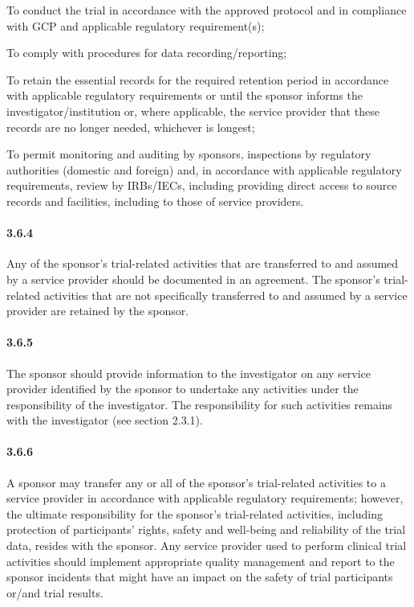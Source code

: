 \documentclass[11pt]{article}
\begin{document}
\begin{description}[leftmargin=2.5cm,style=sameline]

\item[(a)] To conduct the trial in accordance with the approved protocol and in compliance with GCP and applicable regulatory requirement(s);

\item[(b)] To comply with procedures for data recording/reporting;

\item[(c)] To retain the essential records for the required retention period in accordance with applicable regulatory requirements or until the sponsor informs the investigator/institution or, where applicable, the service provider that these records are no longer needed, whichever is longest;

\item[(d)] To permit monitoring and auditing by sponsors, inspections by regulatory authorities (domestic and foreign) and, in accordance with applicable regulatory requirements, review by IRBs/IECs, including providing direct access to source records and facilities, including to those of service providers.

\end{description}

\paragraph{3.6.4} Any of the sponsor's trial-related activities that are transferred to and assumed by a service provider should be documented in an agreement. The sponsor's trial-related activities that are not specifically transferred to and assumed by a service provider are retained by the sponsor.

\paragraph{3.6.5} The sponsor should provide information to the investigator on any service provider identified by the sponsor to undertake any activities under the responsibility of the investigator. The responsibility for such activities remains with the investigator (see section 2.3.1).

\paragraph{3.6.6} A sponsor may transfer any or all of the sponsor's trial-related activities to a service provider in accordance with applicable regulatory requirements; however, the ultimate responsibility for the sponsor's trial-related activities, including protection of participants' rights, safety and well-being and reliability of the trial data, resides with the sponsor. Any service provider used to perform clinical trial activities should implement appropriate quality management and report to the sponsor incidents that might have an impact on the safety of trial participants or/and trial results.
\end{document}
